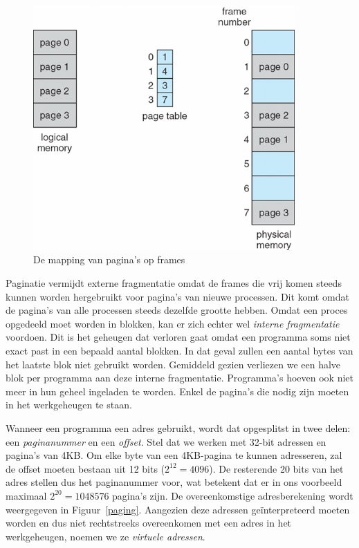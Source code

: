 \begin{figure}
\begin{center}
\includegraphics[width=100mm]{images/pages_frames.png}
\end{center}
\caption{De mapping van pagina's op frames}
\label{pages-frames}
\end{figure}

Paginatie vermijdt externe fragmentatie omdat de frames die vrij komen steeds kunnen worden hergebruikt voor pagina's van nieuwe processen. Dit komt omdat de pagina's van alle processen steeds dezelfde grootte hebben. Omdat een proces opgedeeld moet worden in blokken, kan er zich echter wel \emph{interne fragmentatie} voordoen. Dit is het geheugen dat verloren gaat omdat een programma soms niet exact past in een bepaald aantal blokken. In dat geval zullen een aantal bytes van het laatste blok niet gebruikt worden. Gemiddeld gezien verliezen we een halve blok per programma aan deze interne fragmentatie. Programma's hoeven ook niet meer in hun geheel ingeladen te worden. Enkel de pagina's die nodig zijn moeten in het werkgeheugen te staan.

Wanneer een programma een adres gebruikt, wordt dat opgesplitst in twee delen: een \emph{paginanummer} en een \emph{offset}. Stel dat we werken met 32-bit adressen en pagina's van 4KB. Om elke byte van een 4KB-pagina te kunnen adresseren, zal de offset moeten bestaan uit 12 bits ($2^{12} = 4096$). De resterende 20 bits van het adres stellen dus het paginanummer voor, wat betekent dat er in ons voorbeeld maximaal $2^{20} = 1048576$ pagina's zijn. De overeenkomstige adresberekening wordt weergegeven in Figuur~\ref{paging}. Aangezien deze adressen ge\"interpreteerd moeten worden en dus niet rechtstreeks overeenkomen met een adres in het werkgeheugen, noemen we ze \emph{virtuele adressen}.

